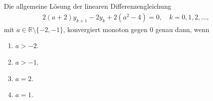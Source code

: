 \subsection*{}
Die allgemeine Lösung der linearen Differenzengleichung
\begin{align*}
2 (a + 2) y_{k+1} - 2 y_k + 2 (a^2 - 4) = 0, \quad k = 0,1,2,...,
\end{align*}
mit $ a \in \mathbb{R} \setminus \{-2,-1  \} $, konvergiert monoton gegen $ 0 $ genau dann, wenn
\renewcommand{\labelenumi}{(\alph{enumi})}
\begin{enumerate}
	\item 
	$ a > -2 $.
	\item
	$a > -1$.
	\item
	$ a = 2 $.
	\item
	$ a = 1 $.
\end{enumerate}